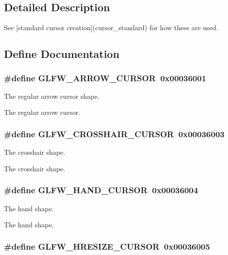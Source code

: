 \subsection{Detailed Description}
See \mbox{[}standard cursor creation\mbox{]}(cursor\_\-standard) for how these are used. 

\subsection{Define Documentation}
\hypertarget{group__shapes_g8ab0e717245b85506cb0eaefdea39d0a}{
\subsubsection[GLFW\_\-ARROW\_\-CURSOR]{\setlength{\rightskip}{0pt plus 5cm}\#define GLFW\_\-ARROW\_\-CURSOR~0x00036001}}
\label{group__shapes_g8ab0e717245b85506cb0eaefdea39d0a}


The regular arrow cursor shape. 

The regular arrow cursor. \hypertarget{group__shapes_g8af88c0ea05ab9e8f9ac1530e8873c22}{
\subsubsection[GLFW\_\-CROSSHAIR\_\-CURSOR]{\setlength{\rightskip}{0pt plus 5cm}\#define GLFW\_\-CROSSHAIR\_\-CURSOR~0x00036003}}
\label{group__shapes_g8af88c0ea05ab9e8f9ac1530e8873c22}


The crosshair shape. 

The crosshair shape. \hypertarget{group__shapes_g1db35e20849e0837c82e3dc1fd797263}{
\subsubsection[GLFW\_\-HAND\_\-CURSOR]{\setlength{\rightskip}{0pt plus 5cm}\#define GLFW\_\-HAND\_\-CURSOR~0x00036004}}
\label{group__shapes_g1db35e20849e0837c82e3dc1fd797263}


The hand shape. 

The hand shape. \hypertarget{group__shapes_gbb3eb0109f11bb808fc34659177ca962}{
\subsubsection[GLFW\_\-HRESIZE\_\-CURSOR]{\setlength{\rightskip}{0pt plus 5cm}\#define GLFW\_\-HRESIZE\_\-CURSOR~0x00036005}}
\label{group__shapes_gbb3eb0109f11bb808fc34659177ca962}


